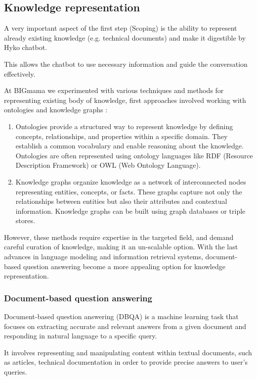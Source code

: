\documentclass[a4paper,12pt]{article}
\begin{document}
\subsection{Knowledge representation}
A very important aspect of the first step (Scoping) is the ability to represent already existing knowledge (e.g. technical documents) 
and make it digestible by Hyko chatbot. 

This allows the chatbot to use necessary information and guide the conversation effectively.

At BIGmama we experimented with various techniques and methods for representing existing body of knowledge, 
first approaches involved working with ontologies and knowledge graphs :

\begin{enumerate}
	\item Ontologies provide a structured way to represent knowledge by defining concepts, relationships, and properties within a specific domain. They establish a common vocabulary and enable reasoning about the knowledge. 
	      Ontologies are often represented using ontology languages like RDF (Resource Description Framework) or OWL (Web Ontology Language).
	\item Knowledge graphs organize knowledge as a network of interconnected nodes representing entities, concepts, or facts. 
	      These graphs capture not only the relationships between entities but also their attributes and contextual information. Knowledge graphs can be built using graph databases or triple stores.
\end{enumerate}

However, these methods require expertise in the targeted field, and demand careful curation of knowledge, making it an un-scalable option. With the last advances in language modeling and information retrieval systems, 
document-based question answering become a more appealing option for knowledge representation.  


\subsubsection{Document-based question answering}
Document-based question answering (DBQA) is a machine learning task that focuses on extracting accurate and relevant answers from a given document and responding in natural language to a specific query. 

It involves representing and manipulating content within textual documents, such as articles, technical documentation in order to provide precise answers to user's queries.
\end{document}
